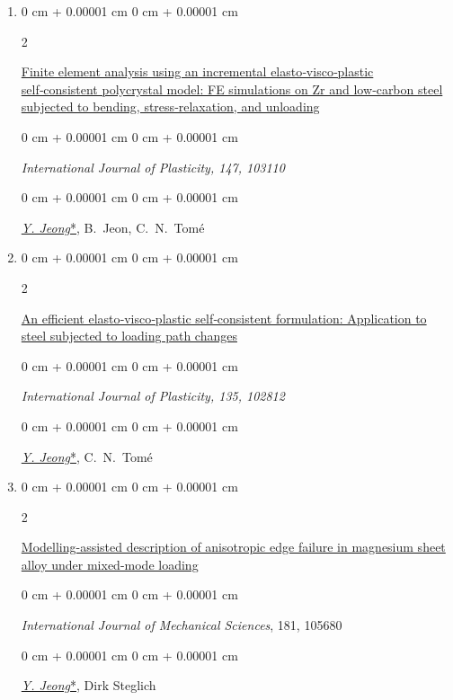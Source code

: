 \documentclass[10pt, letterpaper]{article}
\newenvironment{onecolentry}{
    \begin{adjustwidth}{
        0 cm + 0.00001 cm
    }{
        0 cm + 0.00001 cm
    }
}{
    \end{adjustwidth}
} %
\newenvironment{twocolentry}[2][]{
    \onecolentry
    \def\secondColumn{#2}
    \setcolumnwidth{\fill, 4.5 cm}
    \begin{paracol}{2}
}{
    \switchcolumn \raggedleft \secondColumn
    \end{paracol}
    \endonecolentry
} %
\begin{document}
\begin{enumerate}
        \item
        \begin{twocolentry}{2021}
            \href{https://doi.org/10.1016/j.ijplas.2021.103110}{Finite element analysis using an incremental elasto‑visco‑plastic self‑consistent polycrystal model: FE simulations on Zr and low‑carbon steel subjected to bending, stress‑relaxation, and unloading}
        \end{twocolentry}
        \begin{onecolentry}
            \it{International Journal of Plasticity}, 147, 103110
        \end{onecolentry}
        \begin{onecolentry}
            {\underline{\textit{Y. Jeong}*}}, \mbox{B. Jeon}, \mbox{C. N. Tomé}
        \end{onecolentry}
        \vspace{0.10 cm}

        \item
        \begin{twocolentry}{2020}
            \href{https://doi.org/10.1016/j.ijplas.2020.102812}{An efficient elasto‑visco‑plastic self‑consistent formulation: Application to steel subjected to loading path changes}
        \end{twocolentry}
        \begin{onecolentry}
            \it{International Journal of Plasticity}, 135, 102812
        \end{onecolentry}
        \begin{onecolentry}
            {\underline{\textit{Y. Jeong}*}}, \mbox{C. N. Tomé}
        \end{onecolentry}
        \vspace{0.10 cm}

        \item
        \begin{twocolentry}{2020}
            \href{https://doi.org/10.1016/j.ijmecsci.2020.105680}{Modelling-assisted description of anisotropic edge failure in magnesium sheet alloy under mixed-mode loading}
        \end{twocolentry}
        \begin{onecolentry}
            {\it International Journal of Mechanical Sciences}, 181, 105680
        \end{onecolentry}
        \begin{onecolentry}
            {\underline{\textit{Y. Jeong}*}}, Dirk Steglich
        \end{onecolentry}
        \vspace{0.10 cm}


\end{enumerate}
\end{document}
